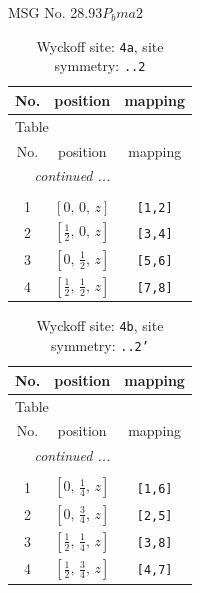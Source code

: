 \documentclass[fleqn,8pt]{jsarticle}
\begin{document}
\setcounter{MaxMatrixCols}{32}

\renewcommand{\tablename}{Table~}
\renewcommand{\figurename}{Figure~}
\begin{center}
\LARGE
MSG No. 28.93\quad$P_{b}ma2$
\end{center}
\renewcommand{\arraystretch}{1.2}
\begin{longtable}{ccc}
\caption{Wyckoff site: {\tt 4a}, site symmetry: {\tt ..2}}
 \\
 \hline \hline
No. & position & mapping \\ \hline \endfirsthead

\multicolumn{2}{l}{\tablename\ \thetable{}} \\
 \hline \hline
No. & position & mapping \\ \hline \endhead

 \hline \hline
\multicolumn{2}{r}{\footnotesize\it continued ...} \\ \endfoot

 \hline \hline
\multicolumn{2}{r}{} \\ \endlastfoot

1 & $\left[ 0,\, 0,\, z \right]$ & {\tt [1,2]} \\ \hline
2 & $\left[ \frac{1}{2},\, 0,\, z \right]$ & {\tt [3,4]} \\ \hline
3 & $\left[ 0,\, \frac{1}{2},\, z \right]$ & {\tt [5,6]} \\ \hline
4 & $\left[ \frac{1}{2},\, \frac{1}{2},\, z \right]$ & {\tt [7,8]} \\
\end{longtable}
\renewcommand{\arraystretch}{1.2}
\begin{longtable}{ccc}
\caption{Wyckoff site: {\tt 4b}, site symmetry: {\tt ..2'}}
 \\
 \hline \hline
No. & position & mapping \\ \hline \endfirsthead

\multicolumn{2}{l}{\tablename\ \thetable{}} \\
 \hline \hline
No. & position & mapping \\ \hline \endhead

 \hline \hline
\multicolumn{2}{r}{\footnotesize\it continued ...} \\ \endfoot

 \hline \hline
\multicolumn{2}{r}{} \\ \endlastfoot

1 & $\left[ 0,\, \frac{1}{4},\, z \right]$ & {\tt [1,6]} \\ \hline
2 & $\left[ 0,\, \frac{3}{4},\, z \right]$ & {\tt [2,5]} \\ \hline
3 & $\left[ \frac{1}{2},\, \frac{1}{4},\, z \right]$ & {\tt [3,8]} \\ \hline
4 & $\left[ \frac{1}{2},\, \frac{3}{4},\, z \right]$ & {\tt [4,7]} \\
\end{longtable}
\end{document}
